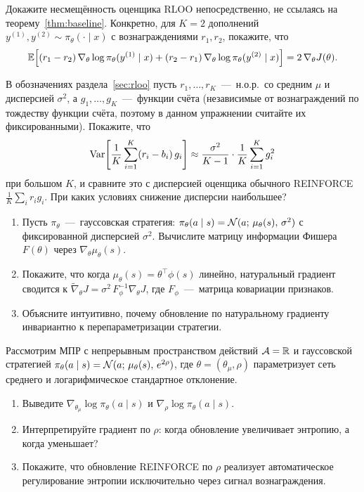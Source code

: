 \begin{exercise}
\label{ex:rloo-unbiased-direct}
Докажите несмещённость оценщика RLOO непосредственно, не ссылаясь на теорему~\ref{thm:baseline}. Конкретно, для $K = 2$ дополнений $y^{(1)}, y^{(2)} \sim \pi_\theta(\cdot \mid x)$ с вознаграждениями $r_1, r_2$, покажите, что
\[
\operatorname{\mathbb{E}}\!\left[(r_1 - r_2)\, \nabla_\theta \log \pi_\theta(y^{(1)} \mid x) + (r_2 - r_1)\, \nabla_\theta \log \pi_\theta(y^{(2)} \mid x)\right] = 2\, \nabla_\theta J(\theta).
\]
\end{exercise}

\begin{exercise}
\label{ex:rloo-variance}
В обозначениях раздела~\ref{sec:rloo} пусть $r_1, \ldots, r_K$ \,---\, н.о.р.\ со средним $\mu$ и дисперсией $\sigma^2$, а $g_1, \ldots, g_K$ \,---\, функции счёта (независимые от вознаграждений по тождеству функции счёта, поэтому в данном упражнении считайте их фиксированными). Покажите, что
\[
\operatorname{Var}\!\left[\frac{1}{K}\sum_{i=1}^K (r_i - b_i)\, g_i\right]
\approx \frac{\sigma^2}{K-1} \cdot \frac{1}{K}\sum_{i=1}^K g_i^2
\]
при большом $K$, и сравните это с дисперсией оценщика обычного REINFORCE $\frac{1}{K}\sum_i r_i g_i$. При каких условиях снижение дисперсии наибольшее?
\end{exercise}

\begin{exercise}
\label{ex:npg-fisher}
\begin{enumerate}
\item Пусть $\pi_\theta$ \,---\, гауссовская стратегия: $\pi_\theta(a \mid s) = \mathcal{N}(a;\, \mu_\theta(s),\, \sigma^2)$ с фиксированной дисперсией $\sigma^2$. Вычислите матрицу информации Фишера $F(\theta)$ через $\nabla_\theta \mu_\theta(s)$.
\item Покажите, что когда $\mu_\theta(s) = \theta^\top \phi(s)$ линейно, натуральный градиент сводится к $\tilde\nabla_\theta J = \sigma^2\, F_\phi^{-1} \nabla_\theta J$, где $F_\phi$ \,---\, матрица ковариации признаков.
\item Объясните интуитивно, почему обновление по натуральному градиенту инвариантно к перепараметризации стратегии.
\end{enumerate}
\end{exercise}

\begin{exercise}
\label{ex:pg-continuous}
Рассмотрим МПР с непрерывным пространством действий $\mathcal{A} = \mathbb{R}$ и гауссовской стратегией $\pi_\theta(a \mid s) = \mathcal{N}(a;\, \mu_\theta(s),\, e^{2\rho})$, где $\theta = (\theta_\mu, \rho)$ параметризует сеть среднего и логарифмическое стандартное отклонение.
\begin{enumerate}
\item Выведите $\nabla_{\theta_\mu} \log \pi_\theta(a \mid s)$ и $\nabla_\rho \log \pi_\theta(a \mid s)$.
\item Интерпретируйте градиент по $\rho$: когда обновление увеличивает энтропию, а когда уменьшает?
\item Покажите, что обновление REINFORCE по $\rho$ реализует автоматическое регулирование энтропии исключительно через сигнал вознаграждения.
\end{enumerate}
\end{exercise}

